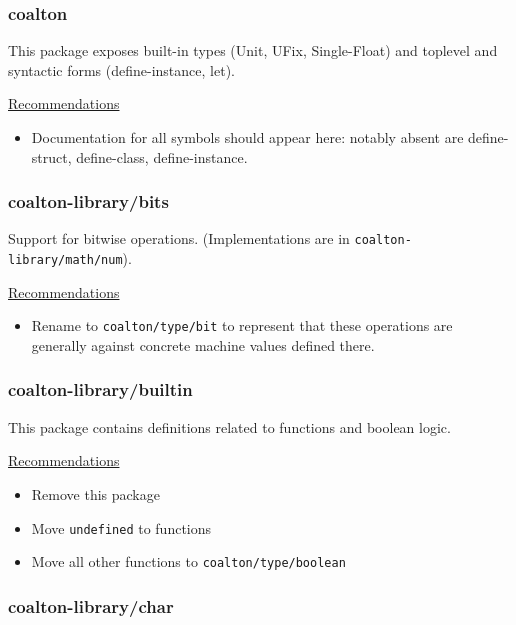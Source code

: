 \documentclass[12pt]{article}
\newcommand{\code}{\texttt}
\begin{document}
\subsubsection{coalton}

This package exposes built-in types (Unit, UFix, Single-Float) and
toplevel and syntactic forms (define-instance, let).

\bigskip
\underline{Recommendations}

\begin{itemize}
\item Documentation for all symbols should appear here: notably absent
  are define-struct, define-class, define-instance.
\end{itemize}

\subsubsection{coalton-library/bits}

Support for bitwise operations. (Implementations are in
\code{coalton-library/math/num}).

\bigskip
\underline{Recommendations}

\begin{itemize}
\item Rename to \code{coalton/type/bit} to represent that these
  operations are generally against concrete machine values defined
  there.
\end{itemize}

\subsubsection{coalton-library/builtin}

This package contains definitions related to functions and boolean
logic.

\bigskip
\underline{Recommendations}

\begin{itemize}
\item Remove this package
\item Move \code{undefined} to functions
\item Move all other functions to \code{coalton/type/boolean}
\end{itemize}

\subsubsection{coalton-library/char}
\end{document}
